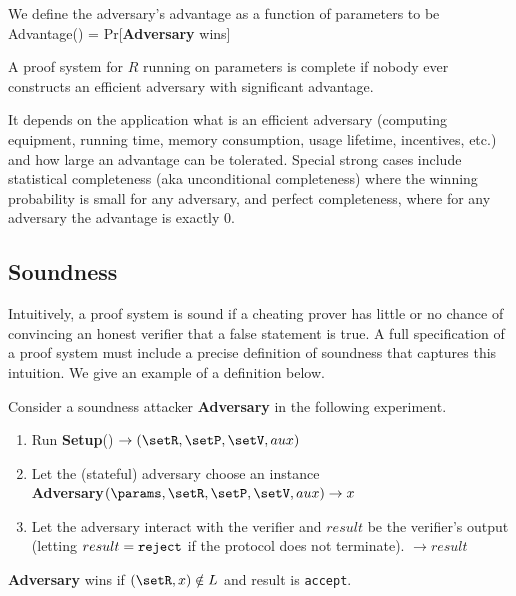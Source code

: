 We define the adversary’s advantage as a function of parameters to be
              	Advantage(\params) = Pr[\textbf{Adversary} wins]
 
A proof system for $R$ running on parameters is complete if nobody ever constructs an efficient adversary with significant advantage.
 
It depends on the application what is an efficient adversary (computing equipment, running time, memory consumption, usage lifetime, incentives, etc.) and how large an advantage can be tolerated. 
Special strong cases include statistical completeness (aka unconditional completeness) where the winning probability is small for any adversary, and perfect completeness, where for any adversary the advantage is exactly 0.
 

\subsection{Soundness}
\label{sec:security:defs-props:soundness}

Intuitively, a proof system is sound if a cheating prover has little or no chance of convincing an honest verifier that a false statement is true. 
A full specification of a proof system must include a precise definition of soundness that captures this intuition. 
We give an example of a definition below.
\loosen
 
Consider a soundness attacker \textbf{Adversary} in the following experiment.

\begin{enumerate}
    \item Run \textbf{Setup}(\params) $\rightarrow (\setR, \setP, \setV, aux)$
    \item Let the (stateful) adversary choose an instance\\
					\textbf{Adversary}$(\params, \setR, \setP, \setV, aux) \rightarrow x$
    \item Let the adversary interact with the verifier and $result$ be the verifier’s output 	
					(letting $result = \tt reject$ if the protocol does not terminate).
 $\rightarrow result$
\end{enumerate}

    \begin{bulletize}
		\item \textbf{Adversary} wins if $(\setR, x) \notin L$ and result is {\tt accept}.
		\end{bulletize}
 
